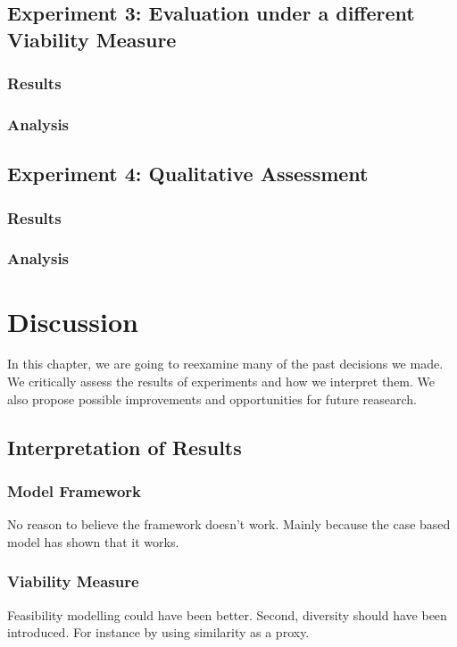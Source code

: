 \documentclass[12pt,a4paper]{report}
\begin{document}
\section{Experiment 3: Evaluation under a different Viability Measure}
\subsection{Results}

\subsection{Analysis}


\section{Experiment 4: Qualitative Assessment}
\subsection{Results}

\subsection{Analysis}



\chapter{Discussion}
\label{sec:dicussion}
In this chapter, we are going to reexamine many of the past decisions we made. We critically assess the results of experiments and how we interpret them. We also propose possible improvements and opportunities for future reasearch.

\section{Interpretation of Results}
\subsection{Model Framework}
No reason to believe the framework doesn't work. Mainly because the case based model has shown that it works. 
\subsection{Viability Measure}
Feasibility modelling could have been better. Second, diversity should have been introduced. For instance by using similarity as a proxy.
\end{document}
